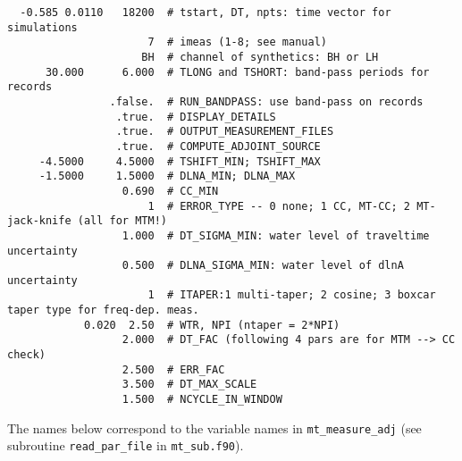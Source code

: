 \documentclass[11pt,titlepage,fleqn]{article}
\begin{document}
\begin{verbatim}
  -0.585 0.0110   18200  # tstart, DT, npts: time vector for simulations
                      7  # imeas (1-8; see manual)
                     BH  # channel of synthetics: BH or LH
      30.000      6.000  # TLONG and TSHORT: band-pass periods for records
                .false.  # RUN_BANDPASS: use band-pass on records
                 .true.  # DISPLAY_DETAILS
                 .true.  # OUTPUT_MEASUREMENT_FILES
                 .true.  # COMPUTE_ADJOINT_SOURCE
     -4.5000     4.5000  # TSHIFT_MIN; TSHIFT_MAX
     -1.5000     1.5000  # DLNA_MIN; DLNA_MAX
                  0.690  # CC_MIN
                      1  # ERROR_TYPE -- 0 none; 1 CC, MT-CC; 2 MT-jack-knife (all for MTM!)
                  1.000  # DT_SIGMA_MIN: water level of traveltime uncertainty
                  0.500  # DLNA_SIGMA_MIN: water level of dlnA uncertainty
                      1  # ITAPER:1 multi-taper; 2 cosine; 3 boxcar taper type for freq-dep. meas.
            0.020  2.50  # WTR, NPI (ntaper = 2*NPI)
                  2.000  # DT_FAC (following 4 pars are for MTM --> CC check)
                  2.500  # ERR_FAC
                  3.500  # DT_MAX_SCALE
                  1.500  # NCYCLE_IN_WINDOW
\end{verbatim}
%
The names below correspond to the variable names in \verb+mt_measure_adj+ (see subroutine \verb+read_par_file+ in \verb+mt_sub.f90+).
%
\end{document}
